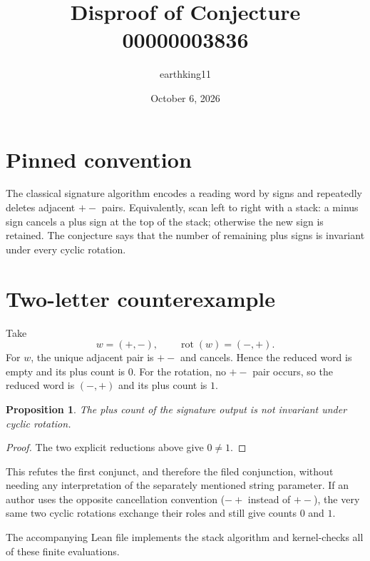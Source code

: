 \documentclass[11pt]{article}
\title{Disproof of Conjecture 00000003836}
\author{earthking11}
\date{October 6, 2026}
\newtheorem{proposition}{Proposition}
\begin{document}
\maketitle
\section*{Pinned convention}
The classical signature algorithm encodes a reading word by signs and
repeatedly deletes adjacent $+-$ pairs.  Equivalently, scan left to right with
a stack: a minus sign cancels a plus sign at the top of the stack; otherwise
the new sign is retained.  The conjecture says that the number of remaining
plus signs is invariant under every cyclic rotation.

\section*{Two-letter counterexample}
Take
\[
 w=(+,-),\qquad \operatorname{rot}(w)=(-,+).
\]
For $w$, the unique adjacent pair is $+-$ and cancels.  Hence the reduced word
is empty and its plus count is $0$.  For the rotation, no $+-$ pair occurs, so
the reduced word is $(-,+)$ and its plus count is $1$.

\begin{proposition}
The plus count of the signature output is not invariant under cyclic rotation.
\end{proposition}
\begin{proof}
The two explicit reductions above give $0\ne1$.
\end{proof}

This refutes the first conjunct, and therefore the filed conjunction, without
needing any interpretation of the separately mentioned string parameter.
If an author uses the opposite cancellation convention ($-+$ instead of
$+-$), the very same two cyclic rotations exchange their roles and still give
counts $0$ and $1$.

The accompanying Lean file implements the stack algorithm and kernel-checks
all of these finite evaluations.
\end{document}
